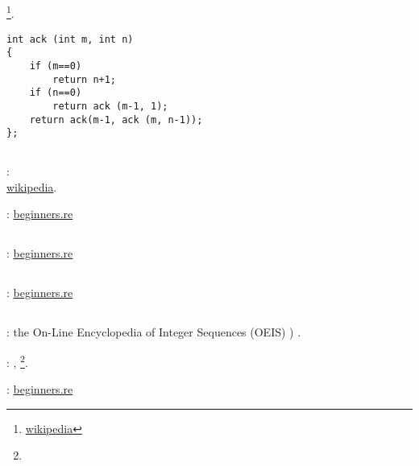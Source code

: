 \subsection{}

\footnote{\href{http://go.yurichev.com/17001}{wikipedia}}.

\begin{lstlisting}
int ack (int m, int n)
{
	if (m==0)
		return n+1;
	if (n==0)
		return ack (m-1, 1);
	return ack(m-1, ack (m, n-1));
};
\end{lstlisting}

\subsection{}

:\\
\href{http://go.yurichev.com/17002}{wikipedia}.

\Sourcecode: \href{http://go.yurichev.com/17152}{beginners.re}

\subsection{}

\Sourcecode: \href{http://go.yurichev.com/17153}{beginners.re}

\subsection{}

\Sourcecode: \href{http://go.yurichev.com/17154}{beginners.re}

\subsection{}

: the On-Line Encyclopedia of Integer Sequences (OEIS) ) .

:  , \footnote{}.

\Sourcecode: \href{http://go.yurichev.com/17155}{beginners.re}

